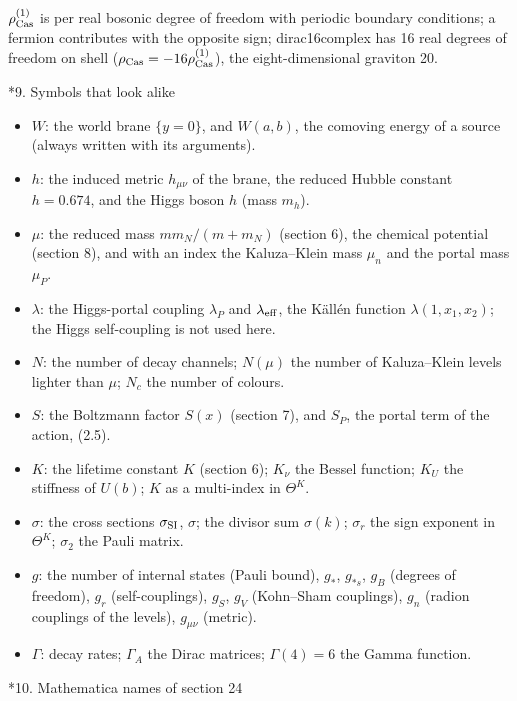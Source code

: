 \documentclass[10pt,a4paper]{article}
\makeatletter
\renewcommand\section{\@startsection{section}{1}{\z@}{-3.5ex \@plus -1ex \@minus -.2ex}{2.3ex \@plus.2ex}{\normalfont\Large\bfseries\raggedright}}
\makeatother
\begin{document}
$\rho_{\rm Cas}^{(1)}$ is per real bosonic degree of freedom with periodic boundary conditions; a fermion contributes with the opposite sign; dirac16complex has 16 real degrees of freedom on shell ($\rho_{\rm Cas}=-16\rho^{(1)}_{\rm Cas}$), the eight-dimensional graviton 20.

\section*{9. Symbols that look alike}
\begin{itemize}
\item $W$: the world brane $\lbrace y=0\rbrace$, and $W(a,b)$, the comoving energy of a source (always written with its arguments).
\item $h$: the induced metric $h_{\mu\nu}$ of the brane, the reduced Hubble constant $h=0.674$, and the Higgs boson $h$ (mass $m_h$).
\item $\mu$: the reduced mass $mm_N/(m+m_N)$ (section 6), the chemical potential (section 8), and with an index the Kaluza–Klein mass $\mu_n$ and the portal mass $\mu_P$.
\item $\lambda$: the Higgs-portal coupling $\lambda_P$ and $\lambda_{\rm eff}$, the Källén function $\lambda(1,x_1,x_2)$; the Higgs self-coupling is not used here.
\item $N$: the number of decay channels; $N(\mu)$ the number of Kaluza–Klein levels lighter than $\mu$; $N_c$ the number of colours.
\item $S$: the Boltzmann factor $S(x)$ (section 7), and $S_P$, the portal term of the action, (2.5).
\item $K$: the lifetime constant $K$ (section 6); $K_\nu$ the Bessel function; $K_U$ the stiffness of $U(b)$; $K$ as a multi-index in $\Theta^K$.
\item $\sigma$: the cross sections $\sigma_{\rm SI}$, $\sigma$; the divisor sum $\sigma(k)$; $\sigma_r$ the sign exponent in $\Theta^K$; $\sigma_2$ the Pauli matrix.
\item $g$: the number of internal states (Pauli bound), $g_*$, $g_{*s}$, $g_B$ (degrees of freedom), $g_r$ (self-couplings), $g_S$, $g_V$ (Kohn–Sham couplings), $g_n$ (radion couplings of the levels), $g_{\mu\nu}$ (metric).
\item $\Gamma$: decay rates; $\Gamma_A$ the Dirac matrices; $\Gamma(4)=6$ the Gamma function.
\end{itemize}
\section*{10. Mathematica names of section 24}
\end{document}
